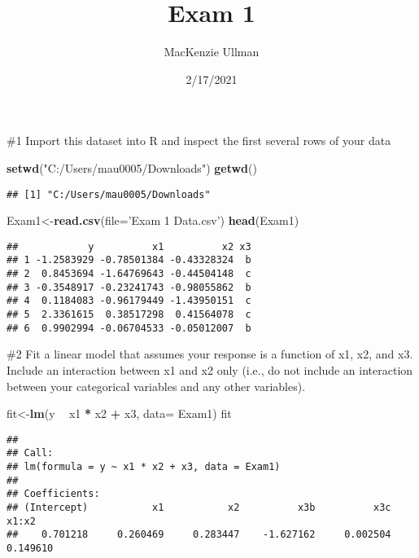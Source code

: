 \documentclass[
]{article}
\title{Exam 1}
\author{MacKenzie Ullman}
\date{2/17/2021}
\newenvironment{Shaded}{\begin{snugshade}}{\end{snugshade}}
\newcommand{\DataTypeTok}[1]{\textcolor[rgb]{0.13,0.29,0.53}{#1}}
\newcommand{\KeywordTok}[1]{\textcolor[rgb]{0.13,0.29,0.53}{\textbf{#1}}}
\newcommand{\NormalTok}[1]{#1}
\newcommand{\OperatorTok}[1]{\textcolor[rgb]{0.81,0.36,0.00}{\textbf{#1}}}
\newcommand{\StringTok}[1]{\textcolor[rgb]{0.31,0.60,0.02}{#1}}
\begin{document}
\maketitle

\#1 Import this dataset into R and inspect the first several rows of
your data

\begin{Shaded}
\begin{Highlighting}[]
\KeywordTok{setwd}\NormalTok{(}\StringTok{"C:/Users/mau0005/Downloads"}\NormalTok{)}
\KeywordTok{getwd}\NormalTok{()}
\end{Highlighting}
\end{Shaded}

\begin{verbatim}
## [1] "C:/Users/mau0005/Downloads"
\end{verbatim}

\begin{Shaded}
\begin{Highlighting}[]
\NormalTok{Exam1<-}\KeywordTok{read.csv}\NormalTok{(}\DataTypeTok{file=}\StringTok{'Exam 1 Data.csv'}\NormalTok{)}
\KeywordTok{head}\NormalTok{(Exam1)}
\end{Highlighting}
\end{Shaded}

\begin{verbatim}
##            y          x1          x2 x3
## 1 -1.2583929 -0.78501384 -0.43328324  b
## 2  0.8453694 -1.64769643 -0.44504148  c
## 3 -0.3548917 -0.23241743 -0.98055862  b
## 4  0.1184083 -0.96179449 -1.43950151  c
## 5  2.3361615  0.38517298  0.41564078  c
## 6  0.9902994 -0.06704533 -0.05012007  b
\end{verbatim}

\#2 Fit a linear model that assumes your response is a function of x1,
x2, and x3. Include an interaction between x1 and x2 only (i.e., do not
include an interaction between your categorical variables and any other
variables).

\begin{Shaded}
\begin{Highlighting}[]
\NormalTok{fit<-}\KeywordTok{lm}\NormalTok{(y }\OperatorTok{~}\StringTok{ }\NormalTok{x1 }\OperatorTok{*}\StringTok{ }\NormalTok{x2 }\OperatorTok{+}\StringTok{ }\NormalTok{x3, }\DataTypeTok{data=}\NormalTok{ Exam1)}
\NormalTok{fit}
\end{Highlighting}
\end{Shaded}

\begin{verbatim}
## 
## Call:
## lm(formula = y ~ x1 * x2 + x3, data = Exam1)
## 
## Coefficients:
## (Intercept)           x1           x2          x3b          x3c        x1:x2  
##    0.701218     0.260469     0.283447    -1.627162     0.002504     0.149610
\end{verbatim}
\end{document}
